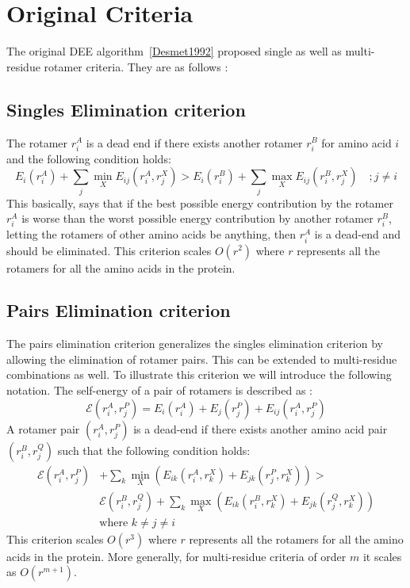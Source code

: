 \documentclass[a4]{article}
\begin{document}
\section{Original Criteria}
The original DEE algorithm~\ref{Desmet1992} proposed single as well as multi-residue rotamer criteria. They are as follows :

\subsection{Singles Elimination criterion}
The rotamer $r_i^A$ is a dead end if there exists another rotamer $r_i^B$ for amino acid $i$ and the following condition holds: 
\begin{equation}	
\label{Singles:criteria} 
E_i(r_i^A) + \sum_j \min_X E_{ij}(r_i^A,r_j^X) > E_i(r_i^B) + \sum_j \max_X E_{ij}(r_i^B,r_j^X) \quad   ; j\neq i
\end{equation}
This basically, says that if the best possible energy contribution by the rotamer $r_i^A$ is worse than the worst possible energy contribution by another rotamer $r_i^B$, letting the rotamers of other amino acids be anything, then $r_i^A$ is a dead-end and should be eliminated.
This criterion scales $O(r^2)$ where $r$ represents all the rotamers for all the amino acids in the protein. 

\subsection{Pairs Elimination criterion}
The pairs elimination criterion generalizes the singles elimination criterion by allowing the elimination of rotamer pairs. This can be extended to multi-residue combinations as well. To illustrate this criterion we will introduce the following notation. The self-energy of a pair of rotamers is described as : 
\[
\mathcal{E}(r_i^A,r_j^P) = E_i(r_i^A) + E_j(r_j^P) + E_{ij}(r_i^A,r_j^P)
\]
A rotamer pair $(r_i^A,r_j^P)$ is a dead-end if there exists another amino acid pair $(r_i^B,r_j^Q)$ such that the following condition holds:
\[
\begin{split}
\mathcal{E}(r_i^A,r_j^P) &+ \sum_k \min_X \left( E_{ik}(r_i^A,r_k^X) + E_{jk}(r_j^P,r_k^X) \right) > \\ & \mathcal{E}(r_i^B,r_j^Q) + \sum_k \max_X \left( E_{ik}(r_i^B,r_k^X) + E_{jk}(r_j^Q,r_k^X) \right) \\
& \text{where $k\neq j \neq i$}
\end{split}
\]
This criterion scales $O(r^3)$ where $r$ represents all the rotamers for all the amino acids in the protein. More generally, for multi-residue criteria of order $m$ it scales as $O(r^{m+1})$. 
\end{document}
